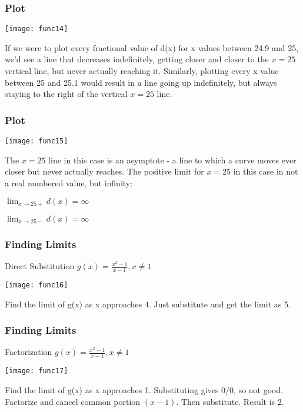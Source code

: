  \begin{frame}[fragile]\frametitle{Plot}
\begin{center}
\texttt{[image: func14]}
\end{center}
If we were to plot every fractional value of d(x) for x values between 24.9 and 25, we'd see a line that decreases indefinitely, getting closer and closer to the $x = 25$ vertical line, but never actually reaching it. Similarly, plotting every x value between 25 and 25.1 would result in a line going up indefinitely, but always staying to the right of the vertical $x = 25$ line.
\end{frame}

 \begin{frame}[fragile]\frametitle{Plot}
\begin{center}
\texttt{[image: func15]}
\end{center}
The $x = 25$ line in this case is an asymptote - a line to which a curve moves ever closer but never actually reaches. The positive limit for $x = 25$ in this case in not a real numbered value, but infinity:

$\lim_{x \to 25+} d(x) = \infty$

$\lim_{x \to 25-} d(x) = \infty$
\end{frame}



 \begin{frame}[fragile]\frametitle{Finding Limits}
Direct Substitution
$g(x) = \frac{x^2 - 1}{x - 1}, x \neq 1$
\begin{center}
\texttt{[image: func16]}
\end{center}
Find the limit of g(x) as x approaches 4. Just substitute and get the limit as 5.
\end{frame}

 \begin{frame}[fragile]\frametitle{Finding Limits}
Factorization
$g(x) = \frac{x^2 - 1}{x - 1}, x \neq 1$
\begin{center}
\texttt{[image: func17]}
\end{center}
Find the limit of g(x) as x approaches 1. Substituting gives 0/0, so not good. Factorize and cancel common portion $(x -1)$. Then substitute. Result is 2.
\end{frame}

